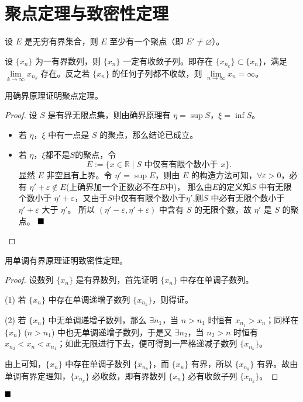 \newpage
\section{聚点定理与致密性定理}
\begin{theorem*}[聚点定理]
    设 \(E\) 是无穷有界集合，则 \(E\) 至少有一个聚点（即 \(E' \neq \varnothing\)）。
\end{theorem*}

\begin{theorem*}\label{thm:bolzano-weierstrass}
    设 \(\{x_n\}\) 为一有界数列，则 \(\{x_n\}\) 一定有收敛子列。即存在 \(\{x_{n_k}\} \subset \{x_n\}\)，满足 \(\lim\limits_{k \to \infty} x_{n_k}\) 存在。反之若 \(\{x_n\}\) 的任何子列都不收敛，则 \(\lim\limits_{n \to \infty} x_n = \infty\)。
\end{theorem*}

\begin{problem}
    用确界原理证明聚点定理。
\end{problem}

\begin{proof}
    设 $S$ 是有界无限点集，则由确界原理有 $\eta = \sup S$，$\xi = \inf S$。
    \begin{itemize}
        \item 若 $\eta$，$\xi$ 中有一点是 $S$ 的聚点，那么结论已成立。
        \item 若 $\eta$，$\xi$都不是$S$的聚点，令
        $$ E := \{ x \in \mathbb{R} \mid S \text{ 中仅有有限个数小于 } x \}.$$
        显然 $E$ 非空且有上界。令 $\eta' = \sup E$，则由 $E$ 的构造方法可知，$\forall \varepsilon > 0$，必有 $\eta' + \varepsilon \notin E$(上确界加一个正数必不在$E$中)，
        那么由$E$的定义知$S$ 中有无限个数小于 $\eta' + \varepsilon$，又由于$S$中仅有有限个数小于$\eta'$,则$S$ 中必有无限个数小于 $\eta' + \varepsilon$ 大于 $\eta'$。
        所以 $(\eta' - \varepsilon, \eta' + \varepsilon)$ 中含有 $S$ 的无限个数，故 $\eta'$ 是 $S$ 的聚点。
        $\hfill \blacksquare$
    \end{itemize}

\end{proof}

\begin{problem}
    用单调有界原理证明致密性定理。
\end{problem}

\begin{proof}
    设数列 $\{x_n\}$ 是有界数列，首先证明 $\{x_n\}$ 中存在单调子数列。
    
    (1) 若 $\{x_n\}$ 中存在单调递增子数列 $\{x_{n_k}\}$，则得证。
    
    (2) 若 $\{x_n\}$ 中无单调递增子数列，那么 $\exists n_1$，当 $n > n_1$ 时恒有 $x_{n_1} > x_n$；同样在 $\{x_n\}$ ($n > n_1$) 中也无单调递增子数列，于是又 $\exists n_2$，当 $n_2 > n$ 时恒有 $x_{n_2} < x_n < x_{n_1}$；如此无限进行下去，便可得到一严格递减子数列 $\{x_{n_k}\}$。
    
    由上可知，$\{x_n\}$ 中存在单调子数列 $\{x_{n_k}\}$，而 $\{x_n\}$ 有界，所以 $\{x_{n_k}\}$ 有界。故由单调有界定理知，$\{x_{n_k}\}$ 必收敛，即有界数列 $\{x_n\}$ 必有收敛子列 $\{x_{n_k}\}$。
 \end{proof}  $\hfill \blacksquare$

